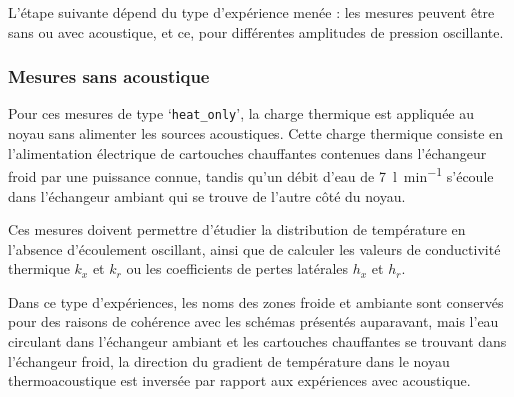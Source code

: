 L'étape suivante dépend du type d'expérience menée : les mesures peuvent être sans ou avec acoustique, et ce, pour  différentes amplitudes de pression oscillante. %

\subsubsection{Mesures sans acoustique}\label{chap:MesureSansAcou}
Pour ces mesures de type `\texttt{heat\_{}only}', la charge thermique est appliquée au noyau sans alimenter les sources acoustiques. Cette charge thermique consiste en l'alimentation électrique de cartouches chauffantes contenues dans l'échangeur froid par une puissance connue, tandis qu'un débit d'eau de \qty{7}{\litre\per\minute} s'écoule dans l'échangeur ambiant qui se trouve de l'autre côté du noyau.

Ces mesures doivent permettre d'étudier la distribution de température en l'absence d'écoulement oscillant, ainsi que de calculer les valeurs de conductivité thermique $k_x$ et $k_r$ ou les coefficients de pertes latérales $h_x$ et $h_r$.\smallskip

Dans ce type d'expériences, les noms des zones \og froide \fg{} et \og ambiante \fg{} sont conservés pour des raisons de cohérence avec les schémas présentés auparavant, mais l'eau circulant dans l'échangeur ambiant et les cartouches chauffantes se trouvant dans l'échangeur froid, la direction du gradient de température dans le noyau thermoacoustique est inversée par rapport aux expériences avec acoustique. %

